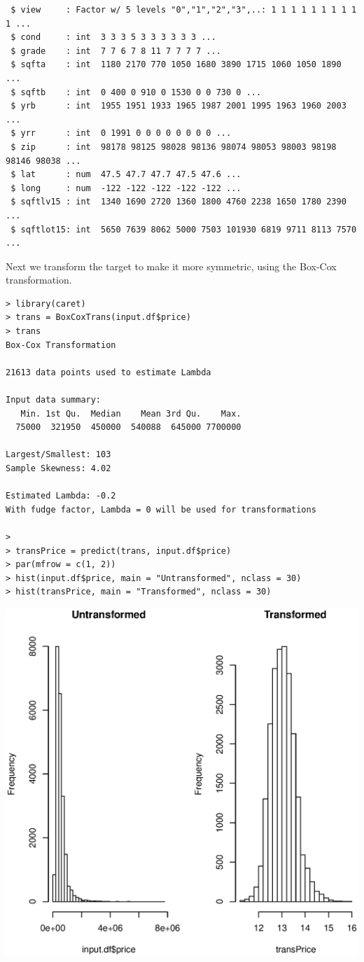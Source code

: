 \documentclass{article}%
\begin{document}
\begin{verbatim}
 $ view     : Factor w/ 5 levels "0","1","2","3",..: 1 1 1 1 1 1 1 1 1 1 ...
 $ cond     : int  3 3 3 5 3 3 3 3 3 3 ...
 $ grade    : int  7 7 6 7 8 11 7 7 7 7 ...
 $ sqfta    : int  1180 2170 770 1050 1680 3890 1715 1060 1050 1890 ...
 $ sqftb    : int  0 400 0 910 0 1530 0 0 730 0 ...
 $ yrb      : int  1955 1951 1933 1965 1987 2001 1995 1963 1960 2003 ...
 $ yrr      : int  0 1991 0 0 0 0 0 0 0 0 ...
 $ zip      : int  98178 98125 98028 98136 98074 98053 98003 98198 98146 98038 ...
 $ lat      : num  47.5 47.7 47.7 47.5 47.6 ...
 $ long     : num  -122 -122 -122 -122 -122 ...
 $ sqftlv15 : int  1340 1690 2720 1360 1800 4760 2238 1650 1780 2390 ...
 $ sqftlot15: int  5650 7639 8062 5000 7503 101930 6819 9711 8113 7570 ...
\end{verbatim}
Next we transform the target to make it more symmetric, using the Box-Cox transformation.
\begin{verbatim}
> library(caret)
> trans = BoxCoxTrans(input.df$price)
> trans
Box-Cox Transformation

21613 data points used to estimate Lambda

Input data summary:
   Min. 1st Qu.  Median    Mean 3rd Qu.    Max.
  75000  321950  450000  540088  645000 7700000

Largest/Smallest: 103
Sample Skewness: 4.02

Estimated Lambda: -0.2
With fudge factor, Lambda = 0 will be used for transformations

>
> transPrice = predict(trans, input.df$price)
> par(mfrow = c(1, 2))
> hist(input.df$price, main = "Untransformed", nclass = 30)
> hist(transPrice, main = "Transformed", nclass = 30)
\end{verbatim}
\includegraphics[width=\textwidth]{Symmetric.eps}
\end{document}
